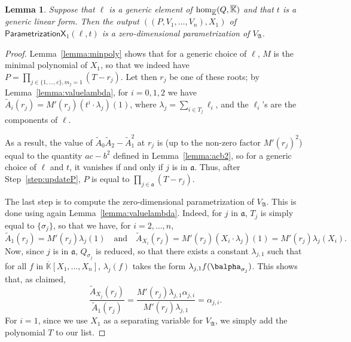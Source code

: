 \documentclass[12pt]{article}
\def\Kbar {{\ensuremath{\overline{\mathbb{K}}}}}
\newtheorem{Lemma}{Lemma}
\begin{document}
\begin{Lemma}
  Suppose that $\ell$ is a generic element of ${\rm
    hom}_{\Kbar}(Q,\Kbar)$ and that $t$ is a generic linear form. Then
  the output $((P,V_1,\dots,V_n),X_1)$ of
  $\mathsf{ParametrizationX}_1(\ell,t)$ is a zero-dimensional
  parametrization of $V_{\mathfrak{A}}$.
\end{Lemma}
\begin{proof}
  Lemma~\ref{lemma:minpoly} shows that for a generic choice of $\ell$,
  $M$ is the minimal polynomial of $X_1$, so that we indeed have
  $P=\prod_{j \in \{1,\dots,c\}, m_j=1} (T-r_j)$. Let then $r_j$ be
  one of these roots; by Lemma~\ref{lemma:valuelambda}, for $i=0,1,2$
  we have $\tilde A_i(r_j) = M'(r_j) (t^i \cdot \lambda_j)(1)$, where
  $\lambda_j =\sum_{i \in T_j} \ell_i$, and the $\ell_i$'s are the
  components of $\ell$. 

  As a result, the value of $\tilde A_0 \tilde A_2 - \tilde A_1^2$ at
  $r_j$ is (up to the non-zero factor $M'(r_j)^2$) equal to the
  quantity $ac-b^2$ defined in Lemma~\ref{lemma:acb2}, so for a
  generic choice of $\ell$ and $t$, it vanishes if and only if $j$ is
  in $\mathfrak{a}$. Thus, after Step~\ref{step:updateP}, 
  $P$ is equal to $\prod_{j \in \mathfrak{a}} (T-r_j)$.

  The last step is to compute the zero-dimensional parametrization of
  $V_{\mathfrak{A}}$. This is done using again
  Lemma~\ref{lemma:valuelambda}. Indeed, for $j$ in $\mathfrak{a}$, 
  $T_j$ is simply equal to $\{\sigma_j\}$, so that we have, for $i=2,\dots,n$,
  $$\tilde A_1(r_j)=M'(r_j) \lambda_j(1) \quad\text{and}\quad \tilde
  A_{X_i}(r_j) = M'(r_j) (X_i \cdot \lambda_j)(1) = M'(r_j) \lambda_j(X_i).$$ Now, since $j$
  is in $\mathfrak{a}$, $Q_{\sigma_j}$ is reduced, so that there
  exists a constant $\lambda_{j,1}$ such that for all $f$ in
  $\Kbar[X_1,\dots,X_n]$, $\lambda_j(f)$ takes the form $\lambda_{j,1}
  f(\balpha_{\sigma_j})$. This shows that, as claimed,
  $$\frac{\tilde A_{X_j}(r_j)}{\tilde A_1 (r_j)} = \frac
  {M'(r_j) \lambda_{j,1} \alpha_{j,i}}{M'(r_j) \lambda_{j,1}} = \alpha_{j,i}.$$
  For $i=1$, since we use $X_1$ as a separating variable for $V_{\mathfrak{A}}$, 
  we simply add the polynomial $T$ to our list.
\end{proof}




\end{document}
